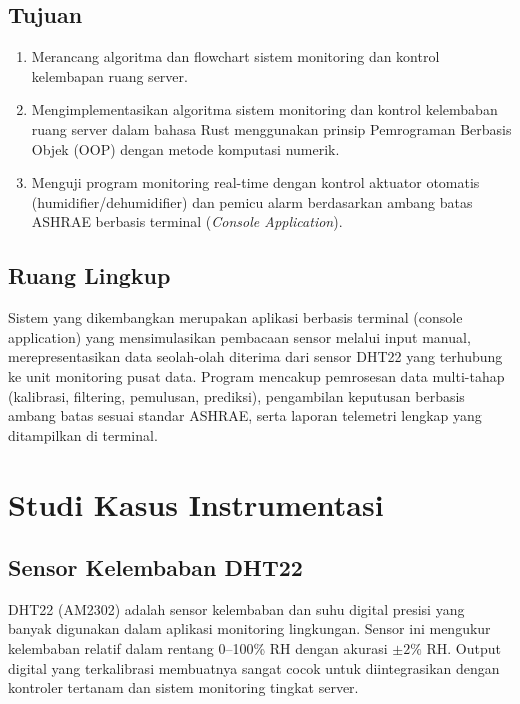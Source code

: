 \documentclass[journal]{IEEEtran}
\begin{document}
\subsection{Tujuan}
\begin{enumerate}
  \item Merancang algoritma dan flowchart sistem monitoring dan kontrol kelembapan ruang server.
  \item Mengimplementasikan algoritma sistem monitoring dan kontrol kelembaban ruang server dalam bahasa Rust menggunakan prinsip Pemrograman Berbasis Objek (OOP) dengan metode komputasi numerik.
  \item Menguji program monitoring real-time dengan kontrol aktuator otomatis (humidifier/dehumidifier) dan pemicu alarm berdasarkan ambang batas ASHRAE berbasis terminal (\textit{Console Application}).
\end{enumerate}

\subsection{Ruang Lingkup}
Sistem yang dikembangkan merupakan aplikasi berbasis terminal (console application) yang mensimulasikan pembacaan sensor melalui input manual, merepresentasikan data seolah-olah diterima dari sensor DHT22 yang terhubung ke unit monitoring pusat data. Program mencakup pemrosesan data multi-tahap (kalibrasi, filtering, pemulusan, prediksi), pengambilan keputusan berbasis ambang batas sesuai standar ASHRAE, serta laporan telemetri lengkap yang ditampilkan di terminal.

\section{Studi Kasus Instrumentasi}

\subsection{Sensor Kelembaban DHT22}
DHT22 (AM2302) adalah sensor kelembaban dan suhu digital presisi yang banyak digunakan dalam aplikasi monitoring lingkungan. Sensor ini mengukur kelembaban relatif dalam rentang 0--100\% RH dengan akurasi $\pm 2\%$ RH. Output digital yang terkalibrasi membuatnya sangat cocok untuk diintegrasikan dengan kontroler tertanam dan sistem monitoring tingkat server.
\end{document}
